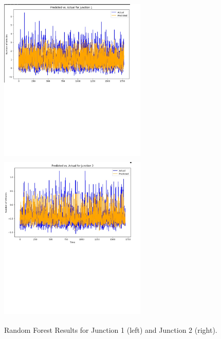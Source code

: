 \documentclass{IEEEtran}
\begin{document}
\begin{figure}[p]
    \centering
    \includegraphics[width=7cm, height=8cm]{Random_forest_junc1.jpg}
    \includegraphics[width=7cm, height=8cm]{Random_forest_junc2.jpg}
    \caption{Random Forest Results for Junction 1 (left) and Junction 2 (right).}
    \label{fig:random_forest_junc_results}
\end{figure}
\end{document}
